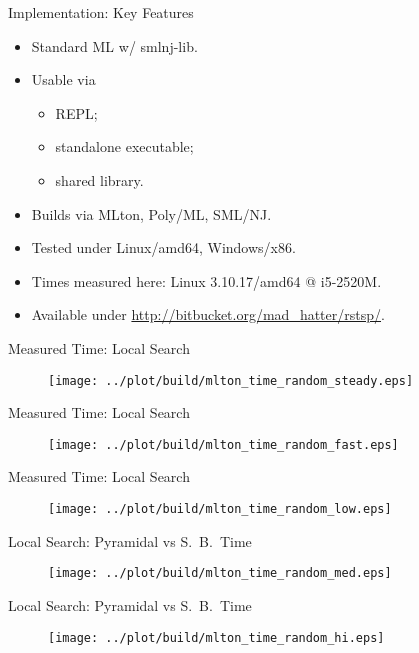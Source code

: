 \documentclass[
  size=8pt,
  style=klope,
  paper=screen,
  mode=present,
  nohandoutpagebreaks,
  pauseslide,
  hlsections,
  fleqn,
]{powerdot}
\begin{document}
\begin{slide}[toc=Key Features]{Implementation: Key Features}
  \begin{itemize}
  \item
  Standard ML w/ smlnj-lib.
  \item
  Usable via
  \begin{itemize}
    \item REPL;
    \item standalone executable;
    \item shared library.
  \end{itemize}
  \item
  Builds via MLton, Poly/ML, SML/NJ.
  \item
  Tested under Linux/{\ttfamily amd64}, Windows/{\ttfamily x86}.
  \item
    Times measured here:
    Linux 3.10.17/{\ttfamily amd64} @ i5-2520M.
  \item
  Available under
    \url{http://bitbucket.org/mad_hatter/rstsp/}.
  \end{itemize}
\end{slide}

\begin{slide}[toc=Benchmarks: Time]{Measured Time: Local Search}
  \begin{figure}[H]
    \centering
      \texttt{[image: ../plot/build/mlton\_time\_random\_steady.eps]}
  \end{figure}
\end{slide}
\begin{slide}[toc=]{Measured Time: Local Search}
  \begin{figure}[H]
    \centering
      \texttt{[image: ../plot/build/mlton\_time\_random\_fast.eps]}
  \end{figure}
\end{slide}
\begin{slide}[toc=]{Measured Time: Local Search}
  \begin{figure}[H]
    \centering
      \texttt{[image: ../plot/build/mlton\_time\_random\_low.eps]}
  \end{figure}
\end{slide}
\begin{slide}[toc=]{Local Search: Pyramidal vs S.\ B.\ Time}
  \begin{figure}[H]
    \centering
      \texttt{[image: ../plot/build/mlton\_time\_random\_med.eps]}
  \end{figure}
\end{slide}
\begin{slide}[toc=]{Local Search: Pyramidal vs S.\ B.\ Time}
  \begin{figure}[H]
    \centering
      \texttt{[image: ../plot/build/mlton\_time\_random\_hi.eps]}
  \end{figure}
\end{slide}
\end{document}
